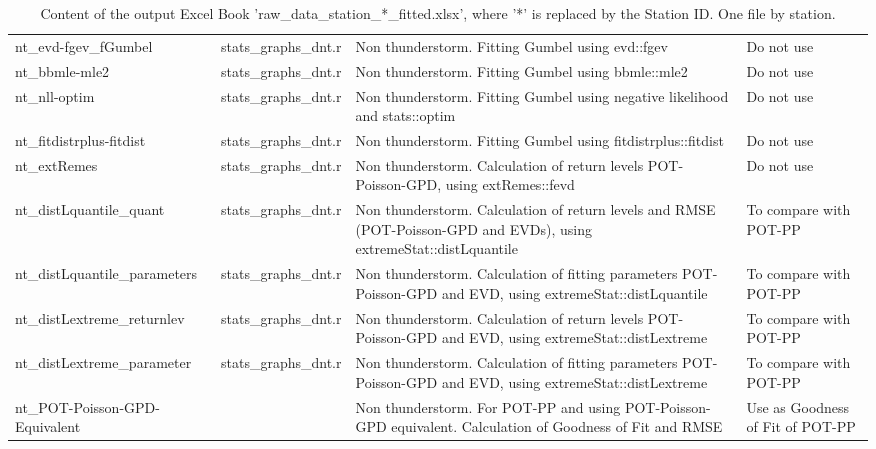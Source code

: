 \documentclass[12pt,oneside]{reedthesis}
\begin{document}
\begingroup\fontsize{8}{10}\selectfont
\begin{longtable}[t]{>{\raggedright\arraybackslash}p{1.5in}>{\raggedright\arraybackslash}p{1in}>{\raggedright\arraybackslash}p{2in}>{\raggedright\arraybackslash}p{1.5in}}
\caption[Content of raw\_data\_station\_*\_fitted.xlsx]{\label{tab:rawdatastationidfitted}Content of the output Excel Book 'raw\_data\_station\_*\_fitted.xlsx', where '*' is replaced by the Station ID. One file by station.}\\
\toprule
\multicolumn{1}{l}{Excel Sheet Name} & \multicolumn{1}{l}{Written By} & \multicolumn{1}{l}{Description} & \multicolumn{1}{l}{Important}\\
\midrule
nt\_evd-fgev\_fGumbel & stats\_graphs\_dnt.r & Non thunderstorm. Fitting Gumbel using evd::fgev & Do not use\\
nt\_bbmle-mle2 & stats\_graphs\_dnt.r & Non thunderstorm. Fitting Gumbel using bbmle::mle2 & Do not use\\
nt\_nll-optim & stats\_graphs\_dnt.r & Non thunderstorm. Fitting Gumbel using negative likelihood and stats::optim & Do not use\\
nt\_fitdistrplus-fitdist & stats\_graphs\_dnt.r & Non thunderstorm. Fitting Gumbel using fitdistrplus::fitdist & Do not use\\
nt\_extRemes & stats\_graphs\_dnt.r & Non thunderstorm. Calculation of return levels POT-Poisson-GPD, using extRemes::fevd & Do not use\\
nt\_distLquantile\_quant & stats\_graphs\_dnt.r & Non thunderstorm. Calculation of return levels and RMSE (POT-Poisson-GPD and EVDs), using extremeStat::distLquantile & To compare with POT-PP\\
nt\_distLquantile\_parameters & stats\_graphs\_dnt.r & Non thunderstorm. Calculation of fitting parameters POT-Poisson-GPD and EVD, using extremeStat::distLquantile & To compare with POT-PP\\
nt\_distLextreme\_returnlev & stats\_graphs\_dnt.r & Non thunderstorm. Calculation of return levels POT-Poisson-GPD and EVD, using extremeStat::distLextreme & To compare with POT-PP\\
nt\_distLextreme\_parameter & stats\_graphs\_dnt.r & Non thunderstorm. Calculation of fitting parameters POT-Poisson-GPD and EVD, using extremeStat::distLextreme & To compare with POT-PP\\
nt\_POT-Poisson-GPD-Equivalent &  & Non thunderstorm. For POT-PP and using POT-Poisson-GPD equivalent. Calculation of Goodness of Fit and RMSE & Use as Goodness of Fit of POT-PP\\

\end{longtable}
\end{document}
